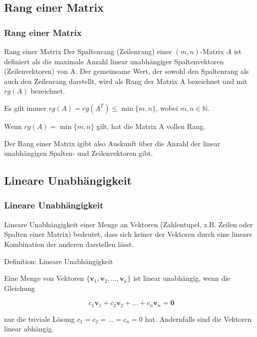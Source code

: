 \documentclass{beamer}
\begin{document}
\subsection{Rang einer Matrix}
\begin{frame}
  \frametitle{Rang einer Matrix}
  
  \begin{block}{Rang einer Matrix}
  Der Spaltenrang (Zeilenrang) einer $(m, n)$-Matrix $A$ ist definiert als die maximale Anzahl linear unabhängiger Spaltenvektoren (Zeilenvektoren) von A. Der gemeinsame Wert, der sowohl den Spaltenrang als auch den Zeilenrang darstellt, wird als Rang der Matrix A bezeichnet und mit $rg(A)$ bezeichnet.
  \end{block}
  
  \vspace{0.3cm}
  
  Es gilt immer $rg(A) = rg(A^T) \leq \min\{m, n\}$, wobei $m, n \in \mathbb{N}$.
  
  \vspace{0.3cm}
  
  Wenn $rg(A) = \min\{m, n\}$ gilt, hat die Matrix A vollen Rang.
  
  \vspace{0.3cm}
  
  Der Rang einer Matrix igibt also  Auskunft über die Anzahl der linear unabhängigen Spalten- und Zeilenvektoren gibt.
\end{frame}

\subsection{Lineare Unabhängigkeit}
\begin{frame}
  \frametitle{Lineare Unabhängigkeit}
  
  Lineare Unabhängigkeit einer Menge an Vektoren (Zahlentupel, z.B. Zeilen oder Spalten einer Matrix) bedeutet, dass sich keiner der Vektoren durch eine lineare Kombination der anderen darstellen lässt.
  
  \vspace{0.3cm}
  
  \begin{block}{Definition: Lineare Unabhängigkeit}
  
  Eine Menge von Vektoren $\{\mathbf{v}_1, \mathbf{v}_2, \ldots, \mathbf{v}_n\}$ ist linear unabhängig, wenn die Gleichung
  
  \[
  c_1 \mathbf{v}_1 + c_2 \mathbf{v}_2 + \ldots + c_n \mathbf{v}_n = \mathbf{0}
  \]
  
  nur die triviale Lösung $c_1 = c_2 = \ldots = c_n = 0$ hat. Andernfalls sind die Vektoren linear abhängig.
  \end{block} 
\end{frame}
\end{document}
